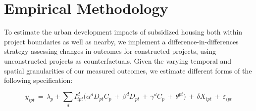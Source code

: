 \documentclass[12pt]{article}
\begin{document}


\section{Empirical Methodology}\label{section:methodology}

To estimate the urban development impacts of subsidized housing both within project boundaries as well as nearby, we implement a difference-in-differences strategy assessing changes in outcomes for constructed projects, using unconstructed projects as counterfactuals. Given the varying temporal and spatial granularities of our measured outcomes, we estimate different forms of the following specification:

\begin{equation}
y_{ipt} \, = \, \lambda_p + \sum\limits_{d} I^d_{ipt}\Big( \alpha^d D_{pt}C_{p} \, + \, \beta^dD_{pt} \, + \, \gamma^dC_{p} \, + \, \theta^{pt} \Big) \, + \, \delta X_{ipt} \, + \, \varepsilon_{ipt}
\end{equation}
\end{document}

